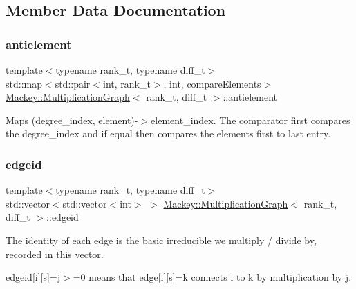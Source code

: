 \subsection{Member Data Documentation}
\mbox{\label{classMackey_1_1MultiplicationGraph_a8a0d1354d01f29d4388142aab0248389}} 
\subsubsection{\texorpdfstring{antielement}{antielement}}
{\footnotesize\ttfamily template$<$typename rank\+\_\+t, typename diff\+\_\+t$>$ \\
std\+::map$<$std\+::pair$<$int, rank\+\_\+t$>$, int, compare\+Elements$>$ \hyperlink{classMackey_1_1MultiplicationGraph}{Mackey\+::\+Multiplication\+Graph}$<$ rank\+\_\+t, diff\+\_\+t $>$\+::antielement\hspace{0.3cm}{\ttfamily [protected]}}



Maps (degree\+\_\+index, element)-\/$>$element\+\_\+index. The comparator first compares the degree\+\_\+index and if equal then compares the elements first to last entry. 

\mbox{\label{classMackey_1_1MultiplicationGraph_aa0eb04947f664262233ed4cdf650371b}} 
\subsubsection{\texorpdfstring{edgeid}{edgeid}}
{\footnotesize\ttfamily template$<$typename rank\+\_\+t, typename diff\+\_\+t$>$ \\
std\+::vector$<$std\+::vector$<$int$>$ $>$ \hyperlink{classMackey_1_1MultiplicationGraph}{Mackey\+::\+Multiplication\+Graph}$<$ rank\+\_\+t, diff\+\_\+t $>$\+::edgeid}



The identity of each edge is the basic irreducible we multiply / divide by, recorded in this vector. 

edgeid\mbox{[}i\mbox{]}\mbox{[}s\mbox{]}=j$>$=0 means that edge\mbox{[}i\mbox{]}\mbox{[}s\mbox{]}=k connects i to k by multiplication by j.

